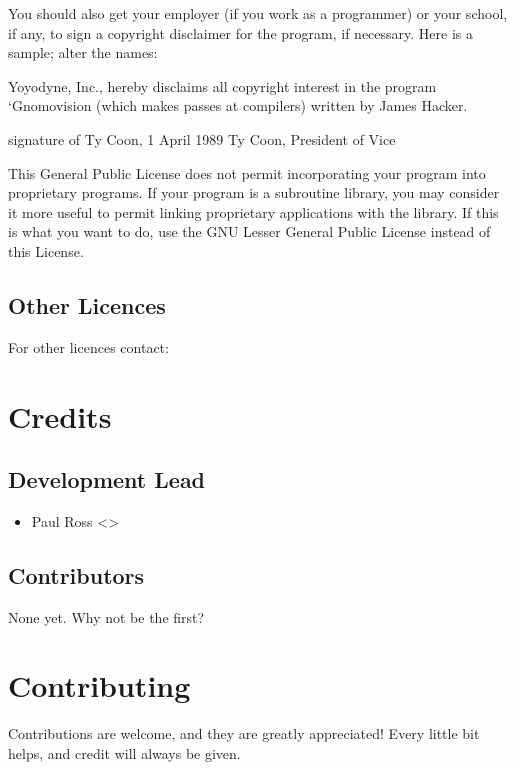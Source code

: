 \documentclass[letterpaper,10pt,english]{sphinxmanual}
\begin{document}
\begin{sphinxVerbatim}[commandchars=\\\{\}]
You should also get your employer (if you work as a programmer) or your
school, if any, to sign a \PYGZdq{}copyright disclaimer\PYGZdq{} for the program, if
necessary.  Here is a sample; alter the names:

  Yoyodyne, Inc., hereby disclaims all copyright interest in the program
  {}`Gnomovision\PYGZsq{} (which makes passes at compilers) written by James Hacker.

  \PYGZlt{}signature of Ty Coon\PYGZgt{}, 1 April 1989
  Ty Coon, President of Vice

This General Public License does not permit incorporating your program into
proprietary programs.  If your program is a subroutine library, you may
consider it more useful to permit linking proprietary applications with the
library.  If this is what you want to do, use the GNU Lesser General
Public License instead of this License.
\end{sphinxVerbatim}


\subsection{Other Licences}
\label{\detokenize{licence:other-licences}}
For other licences contact: 


\section{Credits}
\label{\detokenize{authors:credits}}\label{\detokenize{authors::doc}}

\subsection{Development Lead}
\label{\detokenize{authors:development-lead}}\begin{itemize}
\item {} 
Paul Ross \textless{}\textgreater{}

\end{itemize}


\subsection{Contributors}
\label{\detokenize{authors:contributors}}
None yet. Why not be the first?


\section{Contributing}
\label{\detokenize{contributing:contributing}}\label{\detokenize{contributing::doc}}
Contributions are welcome, and they are greatly appreciated! Every
little bit helps, and credit will always be given.
\end{document}
